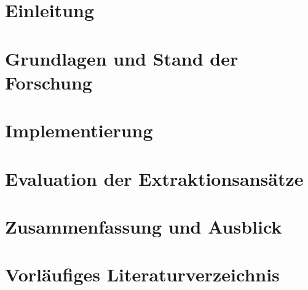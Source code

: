 \documentclass[
  11pt,
  a4paper,
  oneside,
  titlepage,
  numbers=noenddot
]{scrartcl}
\begin{document}
\tableofcontents
\clearpage

\setcounter{page}{1}   %


\section{Einleitung}


\clearpage
\section{Grundlagen und Stand der Forschung}


\clearpage


\clearpage
\section{Implementierung}
\label{sec:implementierung}


\clearpage
\section{Evaluation der Extraktionsansätze}


\clearpage
\section{Zusammenfassung und Ausblick}


\clearpage
\appendix


\section{Vorläufiges Literaturverzeichnis}
\printbibliography
\end{document}
